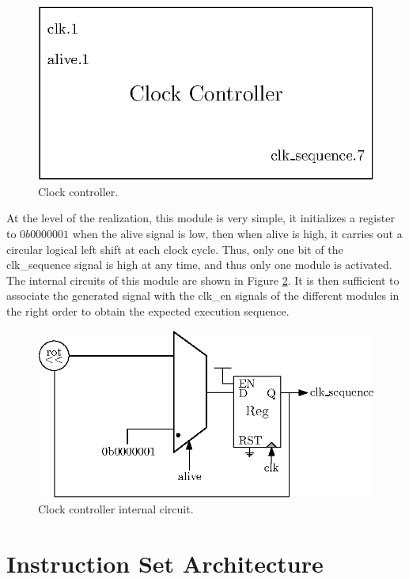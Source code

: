 \begin{figure}[H]
    \centering
    \includegraphics[scale=0.8]{Chapter3-CPU/res/clock_controller}
    \caption{Clock controller.}
    \label{fig:components/cc}
\end{figure}

At the level of the realization, this module is very simple, it initializes a register to 
$0b0000001$ when the alive signal is low, then when alive is high, it carries out a circular logical 
left shift at each clock cycle. Thus, only one bit of the clk\_sequence signal is high at any time, 
and thus only one module is activated. The internal circuits of this module are shown in Figure 
\ref{fig:components/cc_in}. It is then sufficient to associate the generated signal with the clk\_en 
signals of the different modules in the right order to obtain the expected execution sequence.

\begin{figure}[H]
    \centering
    \includegraphics[scale=1.0]{Chapter3-CPU/res/clock_controller_in}
    \caption{Clock controller internal circuit.}
    \label{fig:components/cc_in}
\end{figure}


\section{Instruction Set Architecture}
